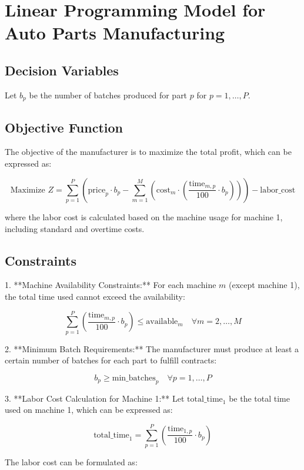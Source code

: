 \documentclass{article}
\begin{document}
\section*{Linear Programming Model for Auto Parts Manufacturing}

\subsection*{Decision Variables}
Let \( b_p \) be the number of batches produced for part \( p \) for \( p = 1, \ldots, P \).

\subsection*{Objective Function}
The objective of the manufacturer is to maximize the total profit, which can be expressed as:

\[
\text{Maximize } Z = \sum_{p=1}^{P} \left( \text{price}_p \cdot b_p - \sum_{m=1}^{M} \left( \text{cost}_m \cdot \left( \frac{\text{time}_{m,p}}{100} \cdot b_p \right) \right) \right) - \text{labor\_cost}
\]

where the labor cost is calculated based on the machine usage for machine 1, including standard and overtime costs.

\subsection*{Constraints}

1. **Machine Availability Constraints:**
   For each machine \( m \) (except machine 1), the total time used cannot exceed the availability:

   \[
   \sum_{p=1}^{P} \left( \frac{\text{time}_{m,p}}{100} \cdot b_p \right) \leq \text{available}_m \quad \forall m = 2, \ldots, M
   \]

2. **Minimum Batch Requirements:**
   The manufacturer must produce at least a certain number of batches for each part to fulfill contracts:

   \[
   b_p \geq \text{min\_batches}_p \quad \forall p = 1, \ldots, P
   \]

3. **Labor Cost Calculation for Machine 1:**
   Let \( \text{total\_time}_1 \) be the total time used on machine 1, which can be expressed as:

   \[
   \text{total\_time}_1 = \sum_{p=1}^{P} \left( \frac{\text{time}_{1,p}}{100} \cdot b_p \right)
   \]

   The labor cost can be formulated as:
   
\end{document}
